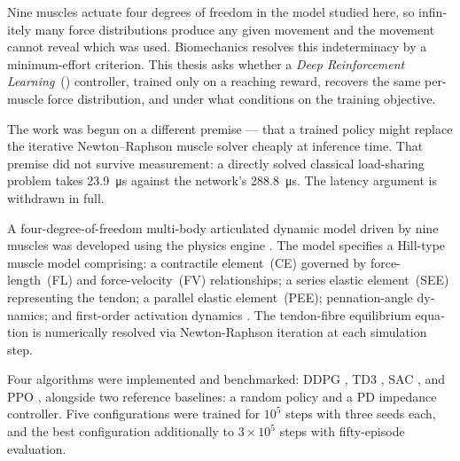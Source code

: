 \begin{otherlanguage}{english}

Nine muscles actuate four degrees of freedom in the model studied here, so
infinitely many force distributions produce any given movement and the movement
cannot reveal which was used. Biomechanics resolves this indeterminacy by a
minimum-effort criterion. This thesis asks whether a \textit{Deep Reinforcement
Learning}~(\DRL{}) controller, trained only on a reaching reward, recovers the
same per-muscle force distribution, and under what conditions on the training
objective.

The work was begun on a different premise --- that a trained policy might replace
the iterative Newton--Raphson muscle solver cheaply at inference time. That
premise did not survive measurement: a directly solved classical load-sharing
problem takes \SI{23.9}{\micro\second} against the network's
\SI{288.8}{\micro\second}. The latency argument is withdrawn in full.

A four-degree-of-freedom multi-body articulated dynamic model driven by nine
muscles was developed using the \MuJoCo{} physics engine
\parencite{Todorov2012}. The model specifies a Hill-type muscle model \parencite{Hill1938, Zajac1989} comprising: a contractile
element~(CE) governed by force-length~(FL) and force-velocity~(FV) relationships; a
series elastic element~(SEE) representing the tendon; a parallel elastic element~(PEE);
pennation-angle dynamics; and first-order activation dynamics \parencite{Thelen2003}.
The tendon-fibre equilibrium equation is numerically resolved via Newton-Raphson
iteration at each simulation step.

Four \DRL{} algorithms were implemented and benchmarked: DDPG
\parencite{Lillicrap2016}, TD3 \parencite{Fujimoto2018}, SAC \parencite{Haarnoja2018},
and PPO \parencite{Schulman2017}, alongside two reference baselines: a random policy
and a PD impedance controller. Five configurations were trained for $10^5$ steps
with three seeds each, and the best configuration additionally to
$3{\times}10^5$ steps with fifty-episode evaluation.


\end{otherlanguage}
